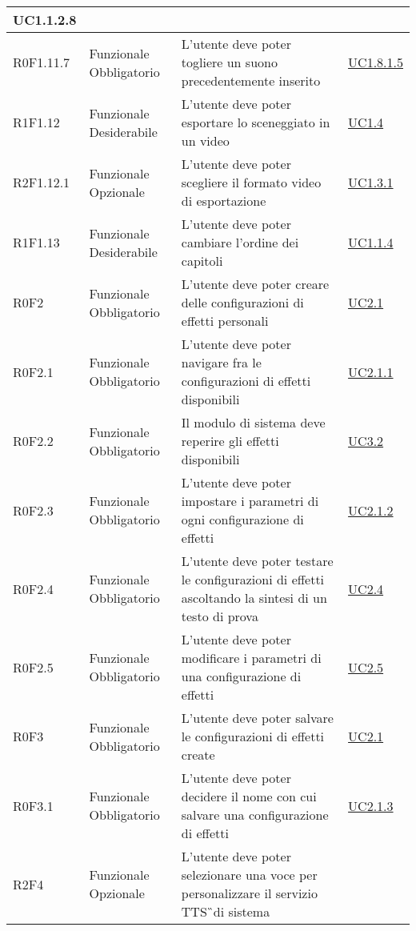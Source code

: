 \begin{center}
\begin{longtable}{| p{2.5cm} | p{3cm} | p{5.25cm} | p{2cm} |}
UC1.1.2.8 }  \\ \hline  R0F1.11.7 & Funzionale \newline Obbligatorio & L'utente deve poter togliere un suono precedentemente inserito &  \hyperref[sec:UC1.8.1.5]{ UC1.8.1.5 }  \\ \hline  R1F1.12 & Funzionale \newline Desiderabile & L'utente deve poter esportare lo sceneggiato in un video &  \hyperref[sec:UC1.4]{ UC1.4 }  \\ \hline  R2F1.12.1 & Funzionale \newline Opzionale & L'utente deve poter scegliere il formato video di esportazione &  \hyperref[sec:UC1.3.1]{ UC1.3.1 }  \\ \hline  R1F1.13 & Funzionale \newline Desiderabile & L'utente deve poter cambiare l'ordine dei capitoli &  \hyperref[sec:UC1.1.4]{ UC1.1.4 }  \\ \hline  R0F2 & Funzionale \newline Obbligatorio & L'utente deve poter creare delle configurazioni di effetti personali &  \hyperref[sec:UC2.1]{ UC2.1 }  \\ \hline  R0F2.1 & Funzionale \newline Obbligatorio & L'utente deve poter navigare fra le configurazioni di effetti disponibili &  \hyperref[sec:UC2.1.1]{ UC2.1.1 }  \\ \hline  R0F2.2 & Funzionale \newline Obbligatorio & Il modulo di sistema deve reperire gli effetti disponibili &  \hyperref[sec:UC3.2]{ UC3.2 }  \\ \hline  R0F2.3 & Funzionale \newline Obbligatorio & L'utente deve poter impostare i parametri di ogni configurazione di effetti &  \hyperref[sec:UC2.1.2]{ UC2.1.2 }  \\ \hline  R0F2.4 & Funzionale \newline Obbligatorio & L'utente deve poter testare le configurazioni di effetti ascoltando la sintesi di un testo di prova &  \hyperref[sec:UC2.4]{ UC2.4 }  \\ \hline  R0F2.5 & Funzionale \newline Obbligatorio & L'utente deve poter modificare i parametri di una configurazione di effetti &  \hyperref[sec:UC2.5]{ UC2.5 }  \\ \hline  R0F3 & Funzionale \newline Obbligatorio & L'utente deve poter salvare le configurazioni di effetti create &  \hyperref[sec:UC2.1]{ UC2.1 }  \\ \hline  R0F3.1 & Funzionale \newline Obbligatorio & L'utente deve poter decidere il nome con cui salvare una configurazione di effetti &  \hyperref[sec:UC2.1.3]{ UC2.1.3 }  \\ \hline  R2F4 & Funzionale \newline Opzionale & L'utente deve poter selezionare una voce per personalizzare il servizio TTS\G\ di sistema &  
\end{longtable}
\end{center}
